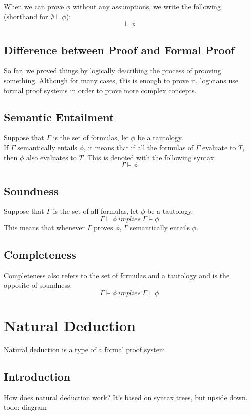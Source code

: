 \documentclass{article}
\theoremstyle{definition}
\begin{document}
  When we can prove $\phi$ without any assumptions, we write the following (shorthand for $\emptyset \vdash \phi$):
  \[\vdash \phi\]

  \subsection{Difference between Proof and Formal Proof}
  So far, we proved things by logically describing the process of prooving something. Although
  for many cases, this is enough to prove it, logicians use formal proof systems in order to
  prove more complex concepts.

  \subsection{Semantic Entailment}
  Suppose that $\Gamma$ is the set of formulas, let $\phi$ be a tautology. \\
  If $\Gamma$ semantically entails $\phi$, it means that if all the formulas of $\Gamma$ evaluate to $T$, then $\phi$ also evaluates to $T$. This is denoted with the following syntax:
  \[\Gamma \vDash \phi\]

  \subsection{Soundness}
  Suppose that $\Gamma$ is the set of all formulas, let $\phi$ be a tautology. \\
  \[\Gamma \vdash \phi\ implies\ \Gamma \vDash \phi\]
  This means that whenever $\Gamma$ proves $\phi$, $\Gamma$ semantically entails $\phi$.

  \subsection{Completeness}
  Completeness also refers to the set of formulas and a tautology and is the opposite of soundness:
  \[\Gamma \vDash \phi\ implies\ \Gamma \vdash \phi\]

  \section{Natural Deduction}
  Natural deduction is a type of a formal proof system.

  \subsection{Introduction}
  How does natural deduction work? It's based on syntax trees, but upside down.
  todo: diagram
\end{document}
